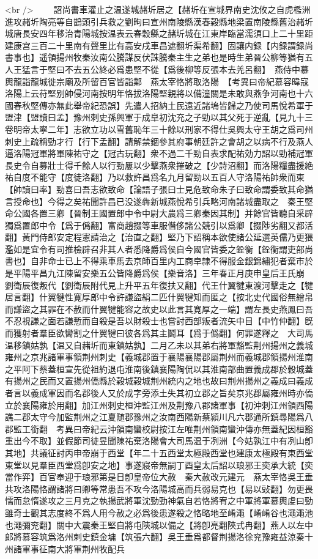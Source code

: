 <br />
　　詔尚書車灌止之温遂城赭圻居之【赭圻在宣城界南史沈攸之自虎檻洲進攻赭圻陶亮等自鵲頭引兵救之劉昫曰宣州南陵縣漢春穀縣地梁置南陵縣舊治赭圻城唐長安四年移治青陽城按温表云春穀縣之赭圻城在江東岸臨當濡須口上二十里距建康宫三百二十里南有聲里比有高安戌車昌遮翻圻渠希翻】固讓内録【内録謂録尚書事也】遥領揚州牧秦汝南公騰謀反伏誅騰秦主生之弟也是時生弟晉公柳等猶有五人王猛言于堅曰不去五公終必爲患堅不從【爲後柳等反張本去羌呂翻】　燕侍中慕輿龍詣龍城徙宗廟及所留百官皆詣鄴　燕太宰恪將取洛陽　【考異曰帝紀慕容暐寇洛陽上云苻堅别帥侵河南按明年恪拔洛陽堅親將以備潼關是未敢與燕争河南也十六國春秋堅傳亦無此舉帝紀恐誤】先遣人招納土民遠近諸塢皆歸之乃使司馬悅希軍于盟津【盟讀曰孟】豫州刺史孫興軍于成臯初沈充之子勁以其父死于逆亂【見九十三卷明帝太寧二年】志欲立功以雪舊恥年三十餘以刑家不得仕吳興太守王胡之爲司州刺史上疏稱勁才行【行下孟翻】請解禁錮參其府事朝廷許之會胡之以病不行及燕人逼洛陽冠軍將軍陳祐守之【冠古玩翻】衆不過二千勁自表求配祐効力詔以勁補冠軍長史令自募壯士得千餘人以行勁屢以少擊燕衆摧破之【少詩沼翻】而洛陽糧盡援絶祐自度不能守【度徒洛翻】乃以救許昌爲名九月留勁以五百人守洛陽祐帥衆而東【帥讀曰率】勁喜曰吾志欲致命【論語子張曰士見危致命朱子曰致命謂委致其命猶言授命也】今得之矣祐聞許昌已没遂犇新城燕悅希引兵略河南諸城盡取之　秦王堅命公國各置三卿【晉制王國置郎中令中尉大農爲三卿秦因其制】并餘官皆聽自采辟獨爲置郎中令【爲于僞翻】富商趙掇等車服僭侈諸公競引以爲卿【掇陟劣翻又都活翻】黃門侍郎安定程憲請治之【治直之翻】堅乃下詔稱本欲使諸公延選英儒乃更猥濫如是宜令有司推檢辟召非其人者悉降爵爲侯自今國官皆委之銓衡【銓衡謂吏部尚書也】自非命士已上不得乘車馬去京師百里内工商皁隸不得服金銀錦繡犯者棄市於是平陽平昌九江陳留安樂五公皆降爵爲侯【樂音洛】三年春正月庚申皇后王氏崩　劉衛辰復叛代【劉衛辰附代見上升平五年復扶又翻】代王什翼犍東渡河擊走之【犍居言翻】什翼犍性寛厚郎中令許謙盜絹二匹什翼犍知而匿之【按北史代國俗無繒帛而謙盜之其罪在不赦而什翼犍能容之故史以此言其寛厚之一端】謂左長史燕鳳曰吾不忍視謙之面若謙慙而自殺是吾以財殺士也嘗討西部叛者流矢中目【中竹仲翻】旣而獲射者羣臣欲臠割之什翼犍曰彼各爲其主鬬耳【爲于僞翻】何罪遂釋之　大司馬温移鎮姑孰【温又自赭圻而東鎮姑孰】二月乙未以其弟右將軍豁監荆州揚州之義城雍州之京兆諸軍事領荆州刺史【義城郡置于襄陽襄陽郡屬荆州而義城郡領揚州淮南之平阿下蔡蓋桓宣先從祖約退屯淮南後鎮襄陽陶侃以其淮南部曲置義成郡於穀城蓋有揚州之民而又置揚州僑縣於穀城穀城荆州統内之地也故曰荆州揚州之義成曰義成者言以義成軍因而名郡後人又於成字旁添土失其初立郡之旨矣京兆郡屬雍州時亦僑立於襄陽雍於用翻】加江州刺史桓沖監江州及荆豫八郡諸軍事【初沖刺江州領西陽譙二郡太守今加監荆州之江夏随郡豫州之汝南西陽新蔡潁川凡六郡通所鎮尋陽爲八郡監工銜翻　考異曰帝紀云沖領南蠻校尉按江左唯荆州領南蠻沖傳亦無蓋紀因桓豁重出今不取】並假節司徒昱聞陳祐棄洛陽會大司馬温于冽洲【今姑孰江中有冽山卽其地】共議征討丙申帝崩于西堂【年二十五西堂太極殿西堂也建康太極殿有東西堂東堂以見羣臣西堂爲卽安之地】事遂寢帝無嗣丁酉皇太后詔以琅邪王奕承大統【奕當作弈】百官奉迎于琅邪第是日卽皇帝位大赦　秦大赦改元建元　燕太宰恪吳王垂共攻洛陽恪謂諸將曰卿等常患吾不攻今洛陽城高而兵弱易克也【易以䜴翻】勿更畏懦而怠惰遂攻之三月克之執揚武將軍沈勁勁神氣自若恪將宥之中軍將軍慕輿䖍曰勁雖奇士觀其志度終不爲人用今赦之必爲後患遂殺之恪略地至崤澠【崤崤谷也澠澠池也澠彌兖翻】關中大震秦王堅自將屯陝城以備之【將卽亮翻陝式冉翻】燕人以左中郎將慕容筑爲洛州刺史鎮金墉【筑張六翻】吳王垂爲都督荆揚洛徐兖豫雍益涼秦十州諸軍事征南大將軍荆州牧配兵
